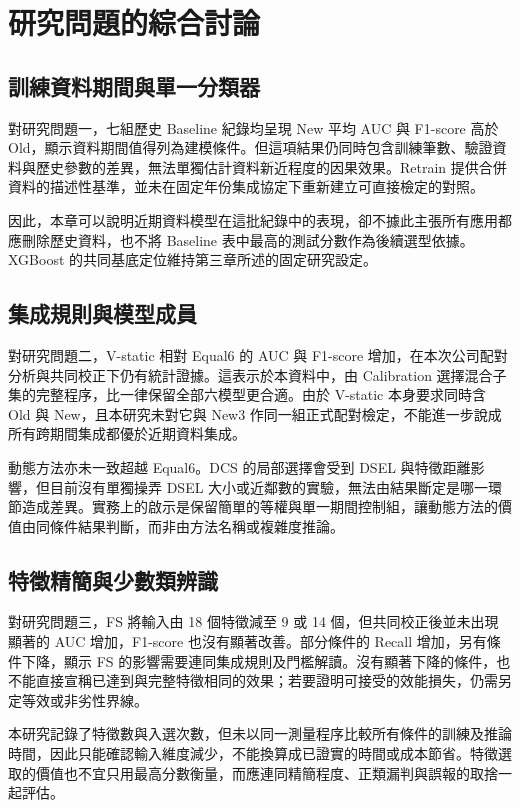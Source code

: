 \section{研究問題的綜合討論}\label{sec:results-discussion}

\subsection{訓練資料期間與單一分類器}

對研究問題一，七組歷史 Baseline 紀錄均呈現 New 平均 AUC 與 F1-score 高於 Old，顯示資料期間值得列為建模條件。但這項結果仍同時包含訓練筆數、驗證資料與歷史參數的差異，無法單獨估計資料新近程度的因果效果。Retrain 提供合併資料的描述性基準，並未在固定年份集成協定下重新建立可直接檢定的對照。

因此，本章可以說明近期資料模型在這批紀錄中的表現，卻不據此主張所有應用都應刪除歷史資料，也不將 Baseline 表中最高的測試分數作為後續選型依據。XGBoost 的共同基底定位維持第三章所述的固定研究設定。

\subsection{集成規則與模型成員}

對研究問題二，V-static 相對 Equal6 的 AUC 與 F1-score 增加，在本次公司配對分析與共同校正下仍有統計證據。這表示於本資料中，由 Calibration 選擇混合子集的完整程序，比一律保留全部六模型更合適。由於 V-static 本身要求同時含 Old 與 New，且本研究未對它與 New3 作同一組正式配對檢定，不能進一步說成所有跨期間集成都優於近期資料集成。

動態方法亦未一致超越 Equal6。DCS 的局部選擇會受到 DSEL 與特徵距離影響，但目前沒有單獨操弄 DSEL 大小或近鄰數的實驗，無法由結果斷定是哪一環節造成差異。實務上的啟示是保留簡單的等權與單一期間控制組，讓動態方法的價值由同條件結果判斷，而非由方法名稱或複雜度推論。

\subsection{特徵精簡與少數類辨識}

對研究問題三，FS 將輸入由 18 個特徵減至 9 或 14 個，但共同校正後並未出現顯著的 AUC 增加，F1-score 也沒有顯著改善。部分條件的 Recall 增加，另有條件下降，顯示 FS 的影響需要連同集成規則及門檻解讀。沒有顯著下降的條件，也不能直接宣稱已達到與完整特徵相同的效果；若要證明可接受的效能損失，仍需另定等效或非劣性界線。

本研究記錄了特徵數與入選次數，但未以同一測量程序比較所有條件的訓練及推論時間，因此只能確認輸入維度減少，不能換算成已證實的時間或成本節省。特徵選取的價值也不宜只用最高分數衡量，而應連同精簡程度、正類漏判與誤報的取捨一起評估。

